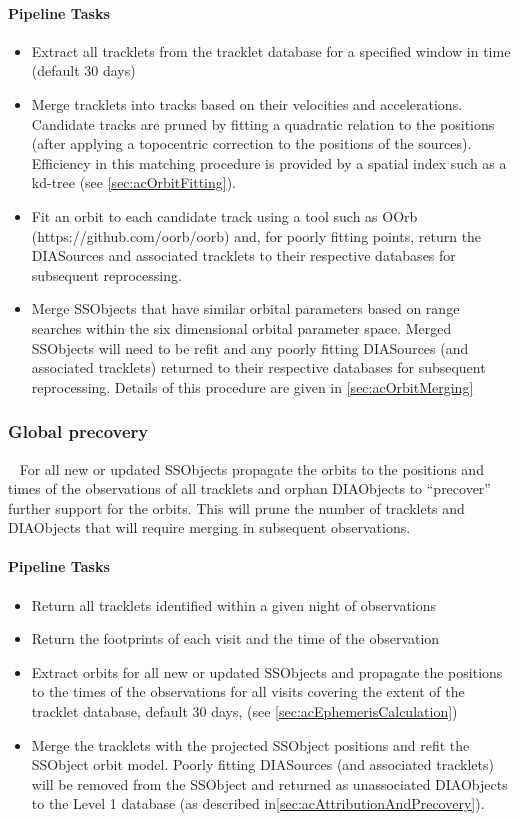\paragraph{Pipeline Tasks}
\begin{itemize}
\item Extract all tracklets from the tracklet database for a specified window in time (default 30 days)
\item Merge tracklets into tracks based on their velocities and accelerations. Candidate tracks are pruned by fitting a quadratic relation to the positions (after applying a topocentric correction to the positions of the sources). Efficiency in this matching procedure is provided by a spatial index such as a kd-tree (see \ref{sec:acOrbitFitting}). 
\item Fit an orbit to each candidate track using a tool such as OOrb (https://github.com/oorb/oorb) and, for poorly fitting  points, return the DIASources and associated tracklets to their respective databases for subsequent reprocessing.
\item Merge SSObjects that have similar orbital parameters based on range searches within the six dimensional orbital parameter space.  Merged SSObjects will need to be refit and any poorly fitting DIASources (and associated tracklets) returned  to their respective databases for subsequent reprocessing. Details of this procedure are given in \ref{sec:acOrbitMerging}
\end{itemize}

\subsubsection{Global precovery}~
For all new or updated SSObjects propagate the orbits to the positions and times of the observations of all tracklets and orphan DIAObjects to ``precover'' further support for the orbits. This will prune the number of tracklets and DIAObjects that will require merging in subsequent observations. 

\paragraph{Pipeline Tasks}
\begin{itemize}
\item Return all tracklets identified within a given night of observations
\item Return the footprints of each visit and the time of the observation
\item Extract orbits for all new or updated SSObjects and propagate the positions to the times of the observations for all visits covering the extent of the tracklet database, default 30 days, (see \ref{sec:acEphemerisCalculation})
\item Merge the tracklets with the projected SSObject positions and refit the SSObject orbit model. Poorly fitting DIASources (and associated tracklets) will be removed from the SSObject and returned as unassociated DIAObjects to the Level 1 database (as described in\ref{sec:acAttributionAndPrecovery}).
\end{itemize}


